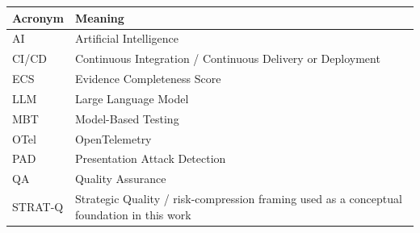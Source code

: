 \documentclass[11pt,a4paper]{article}
\begin{document}
\begin{longtable}{p{3cm}p{10cm}}
\toprule
\textbf{Acronym} & \textbf{Meaning} \\
\midrule
AI & Artificial Intelligence \\
CI/CD & Continuous Integration / Continuous Delivery or Deployment \\
ECS & Evidence Completeness Score \\
LLM & Large Language Model \\
MBT & Model-Based Testing \\
OTel & OpenTelemetry \\
PAD & Presentation Attack Detection \\
QA & Quality Assurance \\
STRAT-Q & Strategic Quality / risk-compression framing used as a conceptual foundation in this work \\
\bottomrule
\end{longtable}
\end{document}
